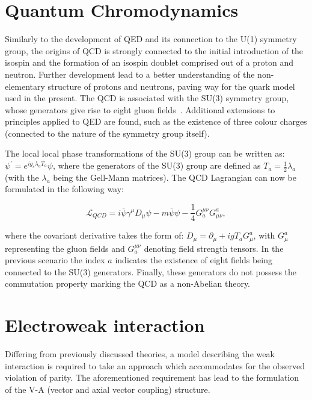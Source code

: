 \section{Quantum Chromodynamics}
\hspace{10pt} Similarly to the development of QED and its connection to the U(1) symmetry group, the origins of QCD is strongly connected to the initial introduction of the isospin and the formation of an isospin doublet comprised out of a proton and neutron. Further development lead to a better understanding of the non-elementary structure of protons and neutrons, paving way for the quark model used in the present. The QCD is associated with the SU(3) symmetry group, whose generators give rise to eight gluon fields~\cite{thomson_2013,book:schwartz, gell_mann}. Additional extensions to principles applied to QED are found, such as the existence of three colour charges (connected to the nature of the symmetry group itself). 

\hspace{10pt} The local local phase transformations of the SU(3) group can be written as: $\psi^{'} = e^{ig_{s}\lambda_a T_a}\psi$, where the generators of the SU(3) group are defined as $T_a = \frac{1}{2}\lambda_a$ (with the $\lambda_a$ being the Gell-Mann matrices). The QCD Lagrangian can now be formulated in the following way:

\begin{equation}
    \mathcal{L}_{QCD} = i\bar{\psi}\gamma^{\mu}D_{\mu}\psi - m\bar{\psi}\psi - \frac{1}{4}G_{a}^{\mu\nu}G^{a}_{\mu\nu},
\end{equation}

where the covariant derivative takes the form of: $D_{\mu} = \partial_{\mu} + igT_aG^{a}_{\mu}$, with $G_{\mu}^a$ representing the gluon fields and  $G_a^{\mu\nu}$ denoting field strength tensors. In the previous scenario the index $a$ indicates the existence of eight fields being connected to the SU(3) generators. Finally, these generators do not possess the commutation property marking the QCD as a non-Abelian theory.
\section{Electroweak interaction}
\label{sec:ew_unification}
\hspace{10pt} Differing from previously discussed theories, a model describing the weak interaction is required to take an approach which accommodates for the observed violation of parity. The aforementioned requirement has lead to the formulation of the V-A (vector and axial vector coupling) structure. 

